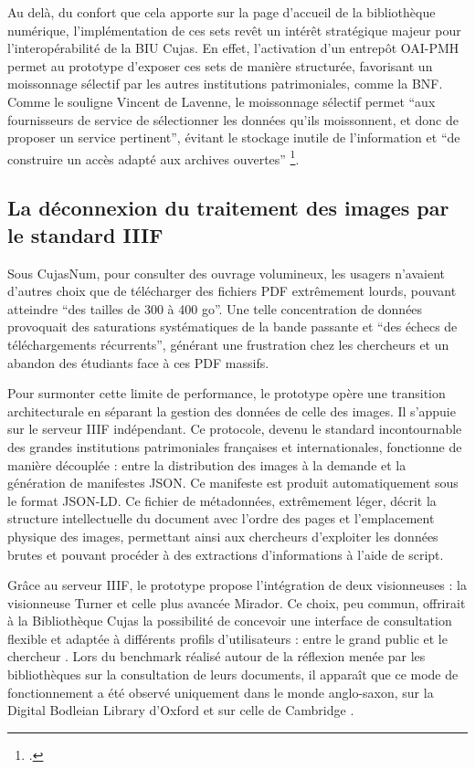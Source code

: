 Au delà, du confort que cela apporte sur la page d'accueil de la bibliothèque numérique, l'implémentation de ces sets revêt un intérêt stratégique majeur pour l'interopérabilité de la \ac{BIU Cujas}. En effet, l'activation d'un entrepôt \ac{OAI-PMH} permet au prototype d'exposer ces sets de manière structurée, favorisant un moissonnage sélectif par les autres institutions patrimoniales, comme la \ac{BNF}. Comme le souligne Vincent de Lavenne, le moissonnage sélectif permet \enquote{aux fournisseurs de service de sélectionner les données qu'ils moissonnent, et donc de proposer un service pertinent}, évitant le stockage inutile de l'information et \enquote{de construire un accès adapté aux archives ouvertes} \footcite{lavennedelamontoiseOAIPMHPMHLheure2020}. 

\subsection{La déconnexion du traitement des images par le standard IIIF}
Sous CujasNum, pour consulter des ouvrage volumineux, les usagers n'avaient d'autres choix que de télécharger des fichiers \ac{PDF} extrêmement lourds, pouvant atteindre \enquote{des tailles de 300 à 400 go}. Une telle concentration de données provoquait des saturations systématiques de la bande passante et \enquote{des échecs de téléchargements récurrents}, générant une frustration chez les chercheurs et un abandon des étudiants face à ces \ac{PDF} massifs. 

Pour surmonter cette limite de performance, le prototype opère une transition architecturale en séparant la gestion des données de celle des images. Il s'appuie sur le serveur \ac{IIIF} indépendant. Ce protocole, devenu le standard incontournable des grandes institutions patrimoniales françaises et internationales, fonctionne de manière découplée : entre la distribution des images à la demande et la génération de manifestes \ac{JSON}. Ce manifeste est produit automatiquement sous le format \ac{JSON-LD}. Ce fichier de métadonnées, extrêmement léger, décrit la structure intellectuelle du document avec l'ordre des pages et l'emplacement physique des images, permettant ainsi aux chercheurs d'exploiter les données brutes et pouvant procéder à des extractions d'informations à l'aide de script.

Grâce au serveur \ac{IIIF}, le prototype propose l'intégration de deux visionneuses : la visionneuse Turner et celle plus avancée Mirador. Ce choix, peu commun, offrirait à la Bibliothèque Cujas la possibilité de concevoir une interface de consultation flexible et adaptée à différents profils d'utilisateurs : entre le grand public et le chercheur . Lors du benchmark réalisé autour de la réflexion menée par les bibliothèques sur la consultation de leurs documents, il apparaît que ce mode de fonctionnement a été observé uniquement dans le monde anglo-saxon, sur la Digital Bodleian Library d'Oxford et sur celle de Cambridge . 

